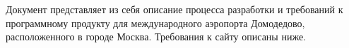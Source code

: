 Документ представляет из себя описание процесса разработки
и требований к программному продукту для международного
аэропорта Домодедово, расположенного в городе Москва.
Требования к сайту описаны ниже.
